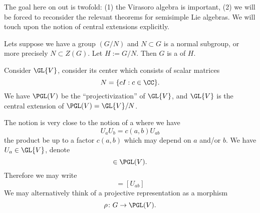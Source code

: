 The goal here on out is twofold: (1) the Virasoro algebra is
important, (2) we will be forced to reconsider the relevant
theorems for semisimple Lie algebras. We will touch upon the
notion of central extensions explicitly.

\begin{defn}
Lets suppose we have a group $(G/N)$ and $N\subset G$ is a normal
subgroup, or more precisely $N\subset Z(G)$. Let $H:=G/N$. Then
$G$ is a  of $H$.
\end{defn}

\begin{ex}
Consider $\GL{V}$, consider its center which consists of scalar
matrices 
\begin{equation}
N = \{ cI : c\in\CC\}.
\end{equation}
We have $\PGL(V)$ be the ``projectivization'' of $\GL{V}$, and
$\GL{V}$ is the central extension of $\PGL(V)=\GL{V}/N$.
\end{ex}

The notion is very close to the notion of a  where we have
\begin{equation}
U_{a}U_{b}=c(a,b)U_{ab}
\end{equation}
the product be up to a factor $c(a,b)$ which may depend on $a$
and/or $b$. We have $U_{a}\in\GL{V}$, denote
\begin{equation}
[U_{a}]\in\PGL(V).
\end{equation}
Therefore we may write
\begin{equation}
[U_{a}][U_{b}]=[U_{ab}]
\end{equation}
We may alternatively think of a projective representation as a
morphism
\begin{equation}
\rho\colon G\to\PGL(V).
\end{equation}


